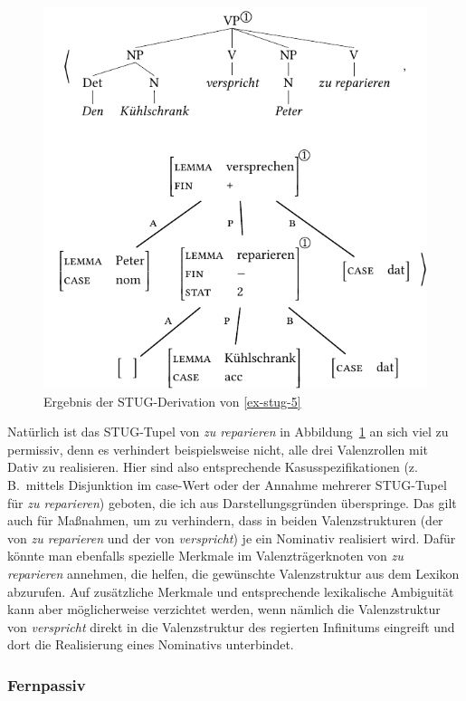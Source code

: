 \begin{figure}[t]
\centering
\includegraphics{graphics/abb98.pdf}
\caption{\label{fig-stug-8}Ergebnis der STUG-Derivation von \ref{ex-stug-5}}
\end{figure}

Natürlich ist das STUG-Tupel von {\it zu reparieren} in Abbildung~\ref{fig-stug-8} an sich viel zu permissiv, denn es verhindert beispielsweise nicht, alle drei Valenzrollen mit Dativ zu realisieren. Hier sind also entsprechende Kasusspezifikationen (z.\,B.\ mittels Disjunktion im {\sc case}-Wert oder der Annahme mehrerer STUG-Tupel für {\it zu reparieren}) geboten, die ich aus Darstellungsgründen überspringe. Das gilt auch für Ma\ss nahmen, um zu verhindern, dass in beiden Valenzstrukturen (der von \textit{zu reparieren} und der von \textit{verspricht}) je ein Nominativ realisiert wird. Dafür könnte man ebenfalls spezielle Merkmale im Valenzträgerknoten von \textit{zu reparieren} annehmen, die helfen, die gewünschte Valenzstruktur aus dem Lexikon abzurufen. Auf zusätzliche Merkmale und entsprechende lexikalische Ambiguität kann aber möglicherweise verzichtet werden, wenn nämlich die Valenzstruktur von \textit{verspricht} direkt in die Valenzstruktur des regierten Infinitums eingreift und dort die Realisierung eines Nominativs unterbindet.   

\subsubsection*{Fernpassiv}

